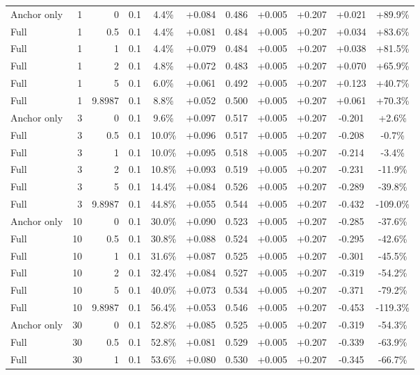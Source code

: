 \begin{table}[htbp]
\begin{tabular}{lrrrccccccc}
Anchor only & 1 & 0 & 0.1 & 4.4\% & +0.084 & 0.486 & +0.005 & +0.207 & +0.021 & +89.9\% \\
Full & 1 & 0.5 & 0.1 & 4.4\% & +0.081 & 0.484 & +0.005 & +0.207 & +0.034 & +83.6\% \\
Full & 1 & 1 & 0.1 & 4.4\% & +0.079 & 0.484 & +0.005 & +0.207 & +0.038 & +81.5\% \\
Full & 1 & 2 & 0.1 & 4.8\% & +0.072 & 0.483 & +0.005 & +0.207 & +0.070 & +65.9\% \\
Full & 1 & 5 & 0.1 & 6.0\% & +0.061 & 0.492 & +0.005 & +0.207 & +0.123 & +40.7\% \\
Full & 1 & 9.8987 & 0.1 & 8.8\% & +0.052 & 0.500 & +0.005 & +0.207 & +0.061 & +70.3\% \\
Anchor only & 3 & 0 & 0.1 & 9.6\% & +0.097 & 0.517 & +0.005 & +0.207 & -0.201 & +2.6\% \\
Full & 3 & 0.5 & 0.1 & 10.0\% & +0.096 & 0.517 & +0.005 & +0.207 & -0.208 & -0.7\% \\
Full & 3 & 1 & 0.1 & 10.0\% & +0.095 & 0.518 & +0.005 & +0.207 & -0.214 & -3.4\% \\
Full & 3 & 2 & 0.1 & 10.8\% & +0.093 & 0.519 & +0.005 & +0.207 & -0.231 & -11.9\% \\
Full & 3 & 5 & 0.1 & 14.4\% & +0.084 & 0.526 & +0.005 & +0.207 & -0.289 & -39.8\% \\
Full & 3 & 9.8987 & 0.1 & 44.8\% & +0.055 & 0.544 & +0.005 & +0.207 & -0.432 & -109.0\% \\
Anchor only & 10 & 0 & 0.1 & 30.0\% & +0.090 & 0.523 & +0.005 & +0.207 & -0.285 & -37.6\% \\
Full & 10 & 0.5 & 0.1 & 30.8\% & +0.088 & 0.524 & +0.005 & +0.207 & -0.295 & -42.6\% \\
Full & 10 & 1 & 0.1 & 31.6\% & +0.087 & 0.525 & +0.005 & +0.207 & -0.301 & -45.5\% \\
Full & 10 & 2 & 0.1 & 32.4\% & +0.084 & 0.527 & +0.005 & +0.207 & -0.319 & -54.2\% \\
Full & 10 & 5 & 0.1 & 40.0\% & +0.073 & 0.534 & +0.005 & +0.207 & -0.371 & -79.2\% \\
Full & 10 & 9.8987 & 0.1 & 56.4\% & +0.053 & 0.546 & +0.005 & +0.207 & -0.453 & -119.3\% \\
Anchor only & 30 & 0 & 0.1 & 52.8\% & +0.085 & 0.525 & +0.005 & +0.207 & -0.319 & -54.3\% \\
Full & 30 & 0.5 & 0.1 & 52.8\% & +0.081 & 0.529 & +0.005 & +0.207 & -0.339 & -63.9\% \\
Full & 30 & 1 & 0.1 & 53.6\% & +0.080 & 0.530 & +0.005 & +0.207 & -0.345 & -66.7\% \\

\end{tabular}
\end{table}
